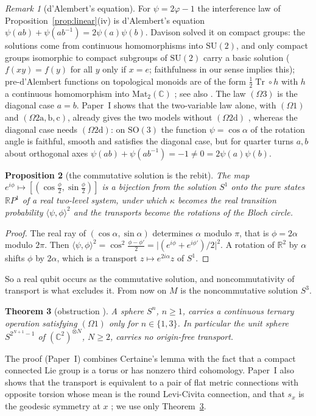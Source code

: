 \documentclass[aps,pra,onecolumn,superscriptaddress,nofootinbib,10pt]{revtex4-2}
\newtheorem{theorem}{Theorem}
\newtheorem{proposition}[theorem]{Proposition}
\theoremstyle{definition}
\theoremstyle{remark}
\newtheorem{remark}[theorem]{Remark}
\newcommand{\R}{\mathbb{R}}
\newcommand{\C}{\mathbb{C}}
\newcommand{\tr}{\operatorname{Tr}}
\newcommand{\ip}[2]{\langle #1,#2\rangle}
\newcommand{\SU}{\mathrm{SU}}
\newcommand{\SO}{\mathrm{SO}}
\begin{document}
\begin{remark}[d'Alembert's equation]\label{rem:dalembert}
For $\psi=2\varphi-1$ the interference law of Proposition~\ref{prop:linear}(iv) is d'Alembert's
equation $\psi(ab)+\psi(ab^{-1})=2\psi(a)\psi(b)$.  Davison \cite{Davison08} solved it on compact groups:
the solutions come from continuous homomorphisms into $\SU(2)$, and only compact groups isomorphic to
compact subgroups of $\SU(2)$ carry a basic solution ($f(xy)=f(y)$ for all $y$ only if $x=e$; faithfulness in
our sense implies this); pre-d'Alembert functions on topological monoids are of the form
$\tfrac12\tr\circ h$ with $h$ a continuous homomorphism into $\mathrm{Mat}_2(\C)$ \cite[Thm.~4.12]{Davison09}; see also
\cite{Stetkaer}.  The law $(\Omega3)$ is the diagonal case $a=b$.  Paper~I shows that the two-variable law
alone, with $(\Omega1)$ and $(\Omega2\mathrm{a,b,c})$, already gives the two models without $(\Omega2\mathrm d)$
\cite[Cor.~3.12]{PaperI}, whereas the diagonal case needs $(\Omega2\mathrm d)$: on $\SO(3)$ the function
$\psi=\cos\alpha$ of the rotation angle is faithful, smooth and satisfies the diagonal case, but for quarter
turns $a,b$ about orthogonal axes $\psi(ab)+\psi(ab^{-1})=-1\neq0=2\psi(a)\psi(b)$.
\end{remark}

\begin{proposition}[the commutative solution is the rebit]\label{prop:rebit}
The map $e^{i\phi}\mapsto[(\cos\tfrac\phi2,\sin\tfrac\phi2)]$ is a bijection from the solution $S^1$
onto the pure states $\R P^1$ of a real two-level system, under which $\kappa$ becomes the real
transition probability $\ip{\psi}{\phi}^2$ and the transports become the rotations of the Bloch circle.
\end{proposition}
\begin{proof}
The real ray of $(\cos\alpha,\sin\alpha)$ determines $\alpha$ modulo $\pi$, that is $\phi=2\alpha$
modulo $2\pi$.  Then $\ip{\psi}{\phi}^2=\cos^2\tfrac{\phi-\phi'}2=\lvert(e^{i\phi}+e^{i\phi'})/2\rvert^2$.
A rotation of $\R^2$ by $\alpha$ shifts $\phi$ by $2\alpha$, which is a transport
$z\mapsto e^{2i\alpha}z$ of $S^1$.
\end{proof}
So a real qubit occurs as the commutative solution, and noncommutativity of transport is what
excludes it.  From now on $M$ is the noncommutative solution $S^3$.

\begin{theorem}[obstruction {\cite[Thm.~5.5]{PaperI}}]\label{thm:obstruction}
A sphere $S^n$, $n\ge1$, carries a continuous ternary operation satisfying $(\Omega1)$ only for
$n\in\{1,3\}$.  In particular the unit sphere $S^{2^{N+1}-1}$ of $(\C^2)^{\otimes N}$, $N\ge2$, carries
no origin-free transport.
\end{theorem}
The proof (Paper~I) combines Certaine's lemma with the fact that a compact connected Lie group is a
torus or has nonzero third cohomology.  Paper~I also shows that the transport is equivalent to a pair
of flat metric connections with opposite torsion whose mean is the round Levi-Civita connection, and
that $s_x$ is the geodesic symmetry at $x$ \cite[Prop.~5.3]{PaperI}; we use only Theorem~\ref{thm:obstruction}.
\end{document}
